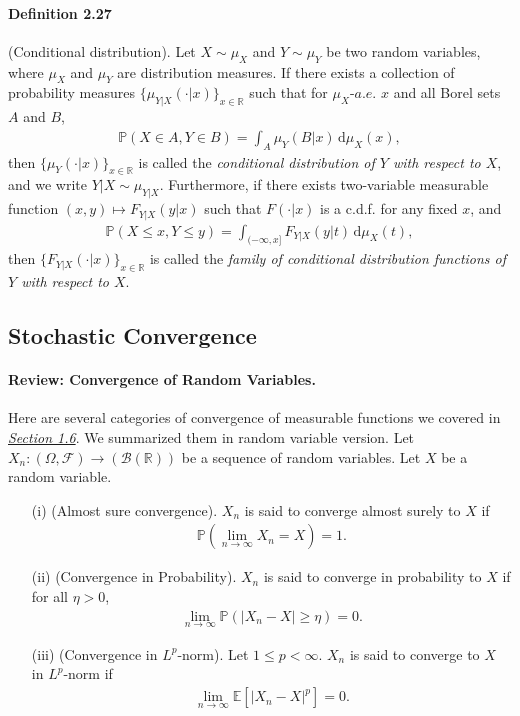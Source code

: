 \documentclass{article}
\numberwithin{equation}{section}
\newcommand{\E}{\mathbb{E}}
\renewcommand{\P}{\mathbb{P}}
\renewcommand{\d}{\mathrm{d}}
\theoremstyle{plain}
\theoremstyle{definition}
\begin{document}
\paragraph{Definition 2.27\label{def:2.27}} (Conditional distribution). Let $X\sim\mu_X$ and $Y\sim\mu_Y$ be two random variables, where $\mu_X$ and $\mu_Y$ are distribution measures. If there exists a collection of probability measures $\{\mu_{Y|X}(\cdot|x)\}_{x\in\mathbb{R}}$ such that for $\mu_X\textit{-a.e.}$ $x$ and all Borel sets $A$ and $B$,
\begin{align*}
	\P(X\in A,Y\in B) = \int_A \mu_Y(B|x)\,\d \mu_X(x),
\end{align*}
then $\{\mu_Y(\cdot|x)\}_{x\in\mathbb{R}}$ is called the \textit{conditional distribution of $Y$ with respect to $X$}, and we write $Y|X\sim\mu_{Y|X}$. Furthermore, if there exists two-variable measurable function $(x,y)\mapsto F_{Y|X}(y|x)$ such that $F(\cdot|x)$ is a c.d.f. for any fixed $x$, and
\begin{align*}
	\P(X\leq x,Y\leq y)=\int_{(-\infty,x]} F_{Y|X}(y|t)\,\d \mu_X(t),
\end{align*}
then $\{F_{Y|X}(\cdot|x)\}_{x\in\mathbb{R}}$ is called the \textit{family of conditional distribution functions of $Y$ with respect to $X$}. 

\newpage
\subsection{Stochastic Convergence}
\paragraph{Review: Convergence of Random Variables.} Here are several categories of convergence of measurable functions we covered in \hyperref[sec:1.6]{\textit{Section 1.6}}. We summarized them in random variable version. Let $X_n:(\Omega,\mathscr{F})\to(\mathscr{B}(\mathbb{R}))$ be a sequence of random variables. Let $X$ be a random variable.
\begin{itemize}
\item[(i)] (Almost sure convergence). $X_n$ is said to converge almost surely to $X$ if
\begin{align*}
	\P\left(\lim_{n\to\infty} X_n=X\right)=1.
\end{align*}
\item[(ii)] (Convergence in Probability). $X_n$ is said to converge in probability to $X$ if for all $\eta>0$,
\begin{align*}
	\lim_{n\to\infty}\P\left(\vert X_n - X\vert\geq\eta\right)= 0.
\end{align*}
\item[(iii)] (Convergence in $L^p$-norm). Let $1\leq p<\infty$. $X_n$ is said to converge to $X$ in $L^p$-norm if
\begin{align*}
	\lim_{n\to\infty}\E\left[\vert X_n-X\vert^p\right] = 0.
\end{align*}
\end{itemize}
\end{document}
